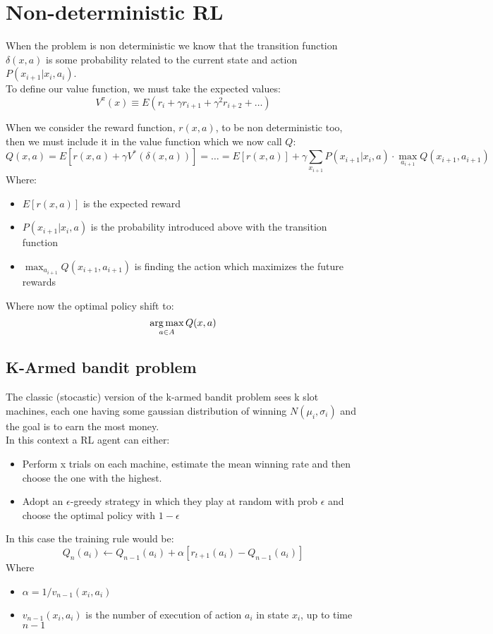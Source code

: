\section{Non-deterministic RL}
When the problem is non deterministic we know that the transition function $\delta(x,a)$ is some probability related to the current state and action $P(x_{i+1}|x_i,a_i)$.\\

To define our value function, we must take the expected values:
$$V^{\pi}(x)\equiv E(r_i +\gamma r_{i+1}+\gamma^2 r_{i+2}+ \dots)$$

When we consider the reward function, $r(x,a)$, to be non deterministic too, then we must include it in the value function which we now call $Q$:
$$Q(x,a)=E[r(x,a)+\gamma V^*(\delta(x,a))]=\dots=E[r(x,a)]+\gamma \sum_{x_{i+1}}P(x_{i+1}|x_i,a)\cdot \max_{a_{i+1}}Q(x_{i+1},a_{i+1})$$
Where:
\begin{itemize}
\item $E[r(x,a)]$ is the expected reward
\item $P(x_{i+1}|x_i,a)$ is the probability introduced above with the transition function
\item $\max_{a_{i+1}}Q(x_{i+1},a_{i+1})$ is finding the action which maximizes the future rewards
\end{itemize}
Where now the optimal policy shift to:
$$\operatorname*{arg\,max}_{a\in A}Q(x,a)$$

\subsection{K-Armed bandit problem}
The classic (stocastic) version of the k-armed bandit problem sees k slot machines, each one having some gaussian distribution of winning $N(\mu_i,\sigma_i)$ and the goal is to earn the most money.\\
In this context a RL agent can either:
\begin{itemize}
\item Perform x trials on each machine, estimate the mean winning rate and then choose the one with the highest.
\item Adopt an $\epsilon$-greedy strategy in which they play at random with prob $\epsilon$ and choose the optimal policy with $1-\epsilon$
\end{itemize}

In this case the training rule would be:
$$Q_n(a_i) \leftarrow Q_{n-1}(a_i)+ \alpha[r_{t+1}(a_i) - Q_{n-1}(a_i)]$$
Where 
\begin{itemize}
\item $\alpha=1/v_{n-1}(x_i,a_i)$
\item $v_{n-1}(x_i,a_i)$ is the number of execution of action $a_i$ in state $x_i$, up to time $n-1$
\end{itemize} 

